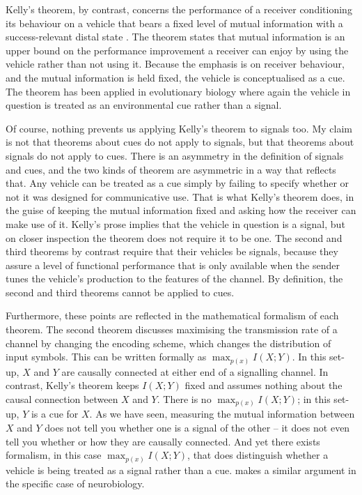 Kelly's theorem, by contrast, concerns the performance of a receiver conditioning its behaviour on a vehicle that bears a fixed level of mutual information with a success-relevant distal state \citep{kelly1956new}.
The theorem states that mutual information is an upper bound on the performance improvement a receiver can enjoy by using the vehicle rather than not using it.
Because the emphasis is on receiver behaviour, and the mutual information is held fixed, the vehicle is conceptualised as a cue.
The theorem has been applied in evolutionary biology \citep{donaldson-matasci2010fitness} where again the vehicle in question is treated as an environmental cue rather than a signal.

Of course, nothing prevents us applying Kelly's theorem to signals too.
My claim is not that theorems about cues do not apply to signals, but that theorems about signals do not apply to cues.
There is an asymmetry in the definition of signals and cues, and the two kinds of theorem are asymmetric in a way that reflects that.
Any vehicle can be treated as a cue simply by failing to specify whether or not it was designed for communicative use.
That is what Kelly's theorem does, in the guise of keeping the mutual information fixed and asking how the receiver can make use of it.
Kelly's prose implies that the vehicle in question is a signal, but on closer inspection the theorem does not require it to be one.
The second and third theorems by contrast require that their vehicles be signals, because they assure a level of functional performance that is only available when the sender tunes the vehicle's production to the features of the channel.
By definition, the second and third theorems cannot be applied to cues.

Furthermore, these points are reflected in the mathematical formalism of each theorem.
The second theorem discusses maximising the transmission rate of a channel by changing the encoding scheme, which changes the distribution of input symbols.
This can be written formally as $\max_{p(x)}I(X;Y)$.
In this set-up, $X$ and $Y$ are causally connected at either end of a signalling channel.
In contrast, Kelly's theorem keeps $I(X;Y)$ fixed and assumes nothing about the causal connection between $X$ and $Y$.
There is no $\max_{p(x)}I(X;Y)$; in this set-up, $Y$ is a cue for $X$.
As we have seen, measuring the mutual information between $X$ and $Y$ does not tell you whether one is a signal of the other -- it does not even tell you whether or how they are causally connected.
And yet there exists formalism, in this case $\max_{p(x)}I(X;Y)$, that does distinguish whether a vehicle is being treated as a signal rather than a cue.
\citet{rathkopf2017neural} makes a similar argument in the specific case of neurobiology.

